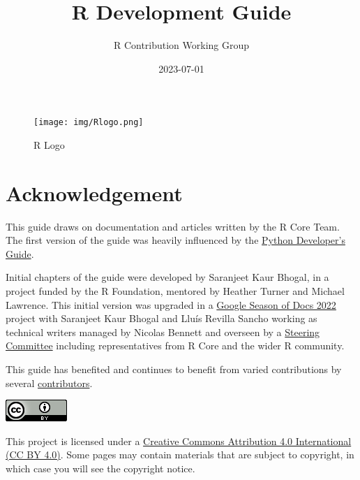 \documentclass[
]{book}
\title{R Development Guide}
\author{R Contribution Working Group}
\date{2023-07-01}
\begin{document}
\maketitle

{
\setcounter{tocdepth}{1}
\tableofcontents
}
\hypertarget{section}{%
\chapter*{}\label{section}}

\begin{figure}
\centering
\texttt{[image: img/Rlogo.png]}
\caption{R Logo}
\end{figure}

\hypertarget{acknowledgement}{%
\chapter*{Acknowledgement}\label{acknowledgement}}

This guide draws on documentation and articles written by the R Core Team. The first version of the guide was heavily influenced by the \href{https://devguide.python.org/}{Python Developer's Guide}.

Initial chapters of the guide were developed by Saranjeet Kaur Bhogal, in a project funded by the R Foundation, mentored by Heather Turner and Michael Lawrence. This initial version was upgraded in a \href{https://github.com/rstats-gsod/gsod2022/wiki/GSOD-2022-Proposal}{Google Season of Docs 2022} project with Saranjeet Kaur Bhogal and Lluís Revilla Sancho working as technical writers managed by Nicolas Bennett and overseen by a \href{https://github.com/rstats-gsod/gsod2022/wiki/GSOD-2022-Proposal\#steering-committee}{Steering Committee} including representatives from R Core and the wider R community.

This guide has benefited and continues to benefit from varied contributions by several \href{https://github.com/r-devel/rdevguide\#contributors-}{contributors}.

\href{https://creativecommons.org/licenses/by/4.0/}{\includegraphics{img/ccby.png}}

This project is licensed under a \href{https://creativecommons.org/licenses/by/4.0/}{Creative Commons Attribution 4.0 International (CC BY 4.0)}. Some pages may contain materials that are subject to copyright, in which case you will see the copyright notice.
\end{document}
